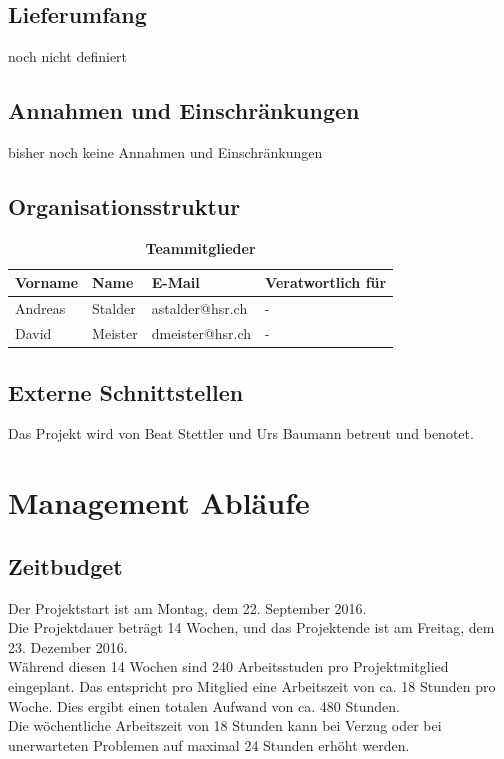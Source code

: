 \documentclass[a4,12pt]{scrartcl}
\begin{document}
\subsection{Lieferumfang}
noch nicht definiert
\subsection{Annahmen und Einschränkungen}
bisher noch keine Annahmen und Einschränkungen
\subsection{Organisationsstruktur}
\begin{table}[H]
\centering
    \begin{tabular}{@{} l l l l@{}}    
    {Vorname} & {Name} & {E-Mail} & Veratwortlich für\\ \midrule
    Andreas & Stalder & astalder@hsr.ch & -\\ \addlinespace
    David & Meister & dmeister@hsr.ch & -\\ \bottomrule
    \end{tabular}
\caption{\textbf{Teammitglieder}}
\end{table} 

\subsection{Externe Schnittstellen}
Das Projekt wird von Beat Stettler und Urs Baumann betreut und benotet.

\section{Management Abläufe}
\subsection{Zeitbudget}
Der Projektstart ist am Montag, dem 22. September 2016. \\
Die Projektdauer beträgt 14 Wochen, und das Projektende ist am Freitag, dem 23. Dezember 2016. \\

\noindent Während diesen 14 Wochen sind 240 Arbeitsstuden pro Projektmitglied eingeplant. Das entspricht pro Mitglied eine Arbeitszeit von ca. 18 Stunden pro Woche. Dies ergibt einen totalen Aufwand von ca. 480 Stunden.\\

\noindent Die wöchentliche Arbeitszeit von 18 Stunden kann bei Verzug oder bei unerwarteten Problemen auf maximal 24 Stunden erhöht werden. \\
\end{document}
